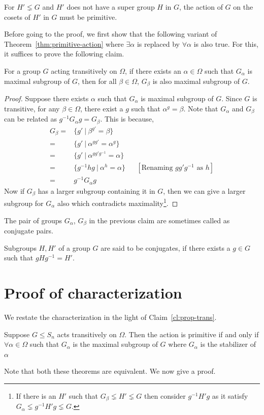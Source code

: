 \begin{corollary}
	For $H' \lneq G$ and $H'$ does not have a super group $H$ in $G$, the
	action of $G$ on the cosets of $H'$ in $G$ must be primitive.
\end{corollary}

Before going to the proof, we first show that the following variant of 
Theorem~\ref{thm:primitive-action} where $\exists \alpha$ is replaced by 
$\forall \alpha$ is also true. For this, it suffices to prove the following
claim.

\begin{claim}
	For a group $G$ acting transitively on $\Omega$, if there exists an
	$\alpha \in \Omega$ such that $G_\alpha$ is maximal subgroup of $G$,
	then for all $\beta \in \Omega$, $G_\beta$ is also maximal subgroup of
	$G$.
	\label{cl:prop-trans}
\end{claim}
\begin{proof}
	Suppose there exists $\alpha$ such that $G_\alpha$ is maximal subgroup
	of $G$. Since $G$ is transitive, for any $\beta \in \Omega$, there
	exist a $g$ such that $\alpha^g = \beta$. Note that $G_\alpha$ and
	$G_\beta$ can be related as $g^{-1}G_\alpha g =
	G_\beta$. This is because,
	\begin{align*}
		G_\beta  =&  \{ g' ~|~ \beta^{g'} = \beta \} \\
			= & \{ g' ~|~ \alpha^{gg'} = \alpha^g \} \\
			= & \{ g' ~|~ \alpha^{gg'g^{-1}} = \alpha \} \\
			= & \{ g^{-1} hg ~|~ \alpha^{h} = \alpha \} &&
			[\text{Renaming $gg'g^{-1}$ as $h$}] \\
			= & g^{-1}G_\alpha g
	\end{align*}
	Now if $G_\beta$ has a larger subgroup containing
	it in $G$, then we can give a larger
	subgroup for $G_\alpha$ also which contradicts maximality\footnote{ If
		there is an $H'$ such that $G_\beta \lneq H' \lneq G$ then
		consider $g^{-1}H'g$ as it satisfy $G_\alpha \lneq g^{-1}H'g
	\lneq G$.}. 
\end{proof}
The pair of groups $G_\alpha$, $G_\beta$ in the previous claim are sometimes
called as conjugate pairs.
\begin{definition}[Conjugates]
	Subgroups $H,H'$ of a group $G$ are said to be conjugates, if there 
	exists a $g \in G$ such that $gHg^{-1} =H'$.
\end{definition}

\section{Proof of characterization}
We restate the characterization in the light of Claim~\ref{cl:prop-trans}.
\begin{theorem}
	Suppose $G \le S_n$ acts transitively on $\Omega$. Then the action is
	primitive if and only if $\forall \alpha \in \Omega$ such that
	$G_{\alpha}$ is the maximal subgroup of $G$ where $G_\alpha$ is the
	stabilizer of $\alpha$
	\label{thm:primitive-action-strong}
\end{theorem}
Note that both these theorems are equivalent. We now give a proof.

